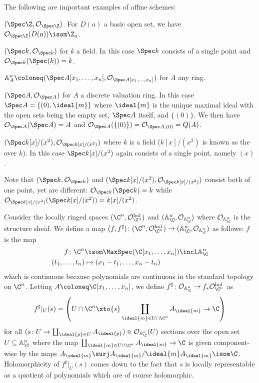 \documentclass[wip, algebra]{bsteffan-lecturenotes}
\newcommand{\cO}{\mathcal{O}}
\newcommand{\A}{\mathbb{A}}
\begin{document}
\begin{example}
	The following are important examples of affine schemes:
	\begin{alphanumerate}
		\item $(\Spec \Z, \cO_{\Spec \Z})$.
			For $D(a)$ a basic open set, we have $\cO_{\Spec \Z}(D(a)) \isom \Z_a$.
		\item $(\Spec k, \cO_{\Spec k})$ for $k$ a field.
			In this case $\Spec k$ consists of a single point and $\cO_{\Spec k}(\Spec(k)) = k$.
		\item $\A^n_A \coloneq (\Spec A[x_1, \ldots, x_n], \cO_{\Spec A[x_1, \ldots, x_n]})$ for $A$ any ring.
		\item $(\Spec A, \cO_{\Spec A})$ for $A$ a discrete valuation ring.
			In this case $\Spec A = \{(0), \ideal{m}\}$ where $\ideal{m}$ is the unique maximal ideal with the open sets being the empty set, $\Spec A$ itself, and $\{(0)\}$.
			We then have $\cO_{\Spec A}(\Spec A) = A$ and $\cO_{\Spec A}(\{(0)\}) = \cO_{\Spec A, (0)} = Q(A)$.
		\item $(\Spec k[x]/(x^2), \cO_{\Spec k[x]/(x^2)})$ where $k$ is a field ($k[x] / (x^2)$ is known as the  over $k$).
			In this case $\Spec k[x]/(x^2)$ again consists of a single point, namely $(x)$.
	\end{alphanumerate}
\end{example}
Note that $(\Spec k, \cO_{\Spec k})$ and $(\Spec k[x]/(x^2), \cO_{\Spec k[x]/(x^2)})$ consist both of one point, yet are different: $\cO_{\Spec k}(\Spec k) = k$ while $\cO_{\Spec k[x]/(x^2)}(\Spec k[x]/(x^2)) = k[x] / (x^2)$.
\begin{example}
	Consider the locally ringed spaces $(\C^n, \cO^\mathrm{hol}_{\C^n})$ and $(\A^n_\C, \cO_{\A^n_\C})$ where $\cO_{\A^n_\C}$ is the structure sheaf.
	We define a map $(f, f^\sharp)\colon (\C^n, \cO^\mathrm{hol}_{\C^n}) \to (\A^n_\C, \cO_{\A^n_\C})$ as follows:
	$f$ is the map 
	\begin{align*}
		f\colon \C^n &\isom \MaxSpec(\C[x_1, \ldots, x_n]) \incl \A^n_\C \\
		(t_1, \ldots, t_n) &\mapsto (x_1 - t_1, \ldots, x_n - t_n)
	\end{align*}
	which is continuous because polynomials are continuous in the standard topology on $\C^n$.
	Letting $A \coloneq \C[x_1, \ldots, x_n]$, we define $f^\sharp\colon \cO_{\A^n_\C} \to f_* \cO^\mathrm{hol}_{\C^n}$ as
	\begin{equation*}
		f^\sharp|_U(s) = \left(U \cap \C^n \xto{s} \coprod_{\ideal{m} \in U \cap \C^n} A_{\ideal{m}} \to \C\right)
	\end{equation*}
	for all $(s\colon U \to \coprod_{\ideal{p} \in U} A_{\ideal{p}}) \in \cO_{\A^n_\C}(U)$ sections over the open set $U \subseteq \A^n_\C$ where the map $\coprod_{\ideal{m} \in U \cap \C^n} A_{\ideal{m}} \to \C$ is given component-wise by the maps $A_{\ideal{m}} \surj A_{\ideal{m}} / \ideal{m} A_{\ideal{m}} \isom \C$.
	Holomorphicity of $f^\sharp|_U(s)$ comes down to the fact that $s$ is locally representable as a quotient of polynomials which are of course holomorphic.
\end{example}
\end{document}
